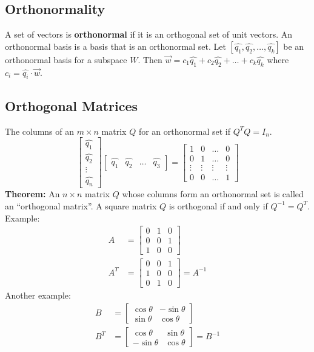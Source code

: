 \documentclass{math}
\begin{document}
\subsection*{Orthonormality}
A set of vectors is \textbf{orthonormal} if it is an orthogonal set of unit
vectors. An orthonormal basis is a basis that is an orthonormal set. Let
\( [\hat{q_1},\hat{q_2},\dots,\hat{q_k}] \) be an orthonormal basis for a
subspace \( W \). Then \( \vec{w} = c_1\hat{q_1}+c_2\hat{q_2}+\dots+
c_k\hat{q_k} \) where \( c_i = \hat{q_i}\cdot\vec{w} \).

\subsection*{Orthogonal Matrices}
The columns of an \( m\times n \) matrix \( Q \) for an orthonormal set if
\( Q^TQ = I_n \).
\[ \begin{bmatrix}\hat{q_1} \\ \hat{q_2} \\ \vdots \\ \hat{q_n}\end{bmatrix}
  \begin{bmatrix}\hat{q_1} & \hat{q_2} & \dots & \hat{q_3}\end{bmatrix} =
  \begin{bmatrix}
    1 & 0 & \dots & 0 \\
    0 & 1 & \dots & 0 \\
    \vdots & \vdots & \vdots & \vdots \\
    0 & 0 & \dots & 1
  \end{bmatrix} \]
\textbf{Theorem:} An \( n\times n \) matrix \( Q \) whose columns form an
orthonormal set is called an ``orthogonal matrix''. A square matrix \( Q \) is
orthogonal if and only if \( Q^{-1} = Q^T \). Example:
\begin{align*}
  A &= \begin{bmatrix}
    0 & 1 & 0 \\
    0 & 0 & 1 \\
    1 & 0 & 0
  \end{bmatrix} \\
  A^T &= \begin{bmatrix}
    0 & 0 & 1 \\
    1 & 0 & 0 \\
    0 & 1 & 0
  \end{bmatrix} = A^{-1}
\end{align*}
Another example:
\begin{align*}
  B &= \begin{bmatrix}
    \cos\theta & -\sin\theta \\
    \sin\theta & \cos\theta
  \end{bmatrix} \\
  B^T &= \begin{bmatrix}
    \cos\theta & \sin\theta \\
    -\sin\theta & \cos\theta
  \end{bmatrix} = B^{-1}
\end{align*}
\end{document}
